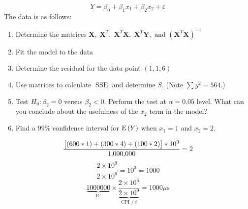 $$Y = \beta_0 + \beta_1 x_1 + \beta_2 x_2 + \varepsilon$$
The data is as follows:

\begin{enumerate}[label=(\alph*)]
    \item Determine the matrices
    $\mathbf X, \;
    \mathbf X^T, \;
    \mathbf X^T\mathbf X,\;
    \mathbf X^T \mathbf Y, \text{ and } (\mathbf X^T\mathbf X)^{-1}$ \vspace{.1in}
    \item Fit the model to the data \vspace{.1in}
    \item Determine the residual for the data point $(1, 1, 6)$\vspace{.1in}
    \item Use matrices to calculate $\operatorname{SSE}$ and determine $S$. (Note $\sum y^2 = 564$.) \vspace{.1in}
    \item Test $H_0 : \beta_2 = 0$ versus $\beta_2 < 0$. Perform the test at $\alpha = 0.05$ level. What can you conclude about the usefulness of the $x_2$ term in the model? \vspace{.1in}
    \item Find a $99\%$ confidence interval for $\E{Y}$ when $x_1 = 1$ and $x_2 = 2$.
\end{enumerate}

\nnl $$\frac{\big[ {(600 * 1) + (300 * 4) + (100 * 2 )} \big] * 10^3 }{\num{1000000}} = 2$$
$${\frac{2 \times 10^9}{2 \times 10^6} = 10^3 = 1000}$$
$$\underbrace{\num{1000000}}_{\text{IC}} \times \underbrace{\frac{2 \times 10^6}{2 \times 10^9}}_{\text{CPI / f}} = 1000 \mu \text{s}$$